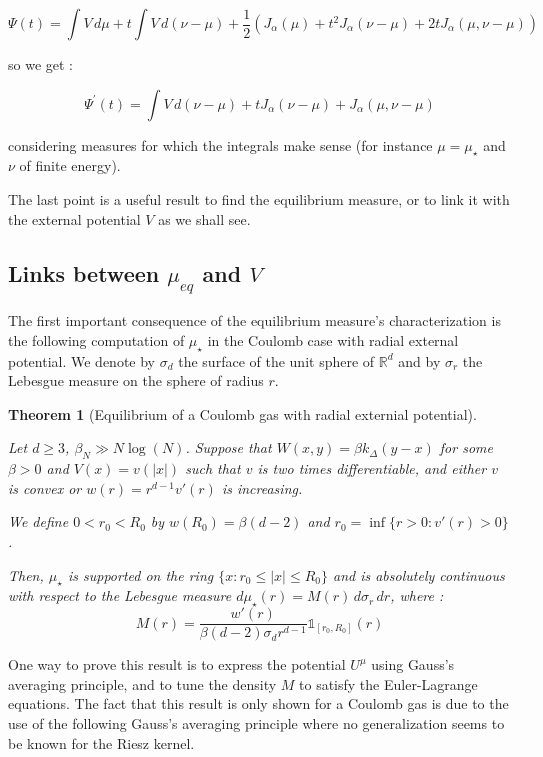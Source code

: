 \documentclass[a4paper,12pt]{report}
\newtheorem{thm}{Theorem}
\begin{document}
\[\Psi(t) = \int V\,d\mu + t\int V\,d (\nu - \mu) +\frac{1}{2}\left(J_{\alpha}(\mu) + t^{2} J_{\alpha}(\nu - \mu) + 2t J_{\alpha}(\mu, \nu - \mu)\right)\]

so we get :

\[\Psi^{'}(t) = \int V\,d(\nu-\mu) +  t J_{\alpha}(\nu - \mu) + J_{\alpha}(\mu, \nu - \mu)\]

considering measures for which the integrals make sense (for instance $\mu = \mu_{\star}$ and $\nu$ of finite energy).

The last point is a useful result to find the equilibrium measure, or to link it with the external potential $V$ as we shall see.


\subsection{Links between $\mu_{eq}$ and $V$}

The first important consequence of the equilibrium measure's characterization is the following computation of $\mu_{\star}$ in the Coulomb case with radial external potential. We denote by $\sigma_d$ the surface of the unit sphere of $\mathbb{R}^{d}$ and by $\sigma_r$ the Lebesgue measure on the sphere of radius $r$.

\begin{thm}[Equilibrium of a Coulomb gas with radial externial potential]\label{cgz:rad}

Let $d \geq 3$, $\beta_{N} \gg N\log(N)$. Suppose that $W(x, y) = \beta k_{\Delta}(y-x)$ for some $\beta > 0$ and $V(x) = v(\lvert x \rvert)$ such that $v$ is two times differentiable, and either $v$ is convex or $w(r) = r^{d-1} v'(r)$ is increasing.

We define $0 < r_0 < R_0$ by $w(R_0) = \beta (d-2)$ and $r_0 = \inf\{r > 0 : v'(r) > 0\}$.
\vspace{0.5cm}

Then, $\mu_{\star}$ is supported on the ring $\{x : r_0 \leq \lvert x \rvert \leq R_0\}$ and is absolutely continuous with respect to the Lebesgue measure $d\mu_{\star}(r) = M(r) \,d\sigma_{r}\,dr$, where :
\[M(r) = \frac{w'(r)}{\beta (d-2)\sigma_{d} r^{d-1}}\mathds{1}_{[r_0, R_0]}(r)\]
\end{thm}

One way to prove this result is to express the potential $U^{\mu}$ using Gauss's averaging principle, and to tune the density $M$ to satisfy the Euler-Lagrange equations. The fact that this result is only shown for a Coulomb gas is due to the use of the following Gauss's averaging principle where no generalization seems to be known for the Riesz kernel.
\end{document}
